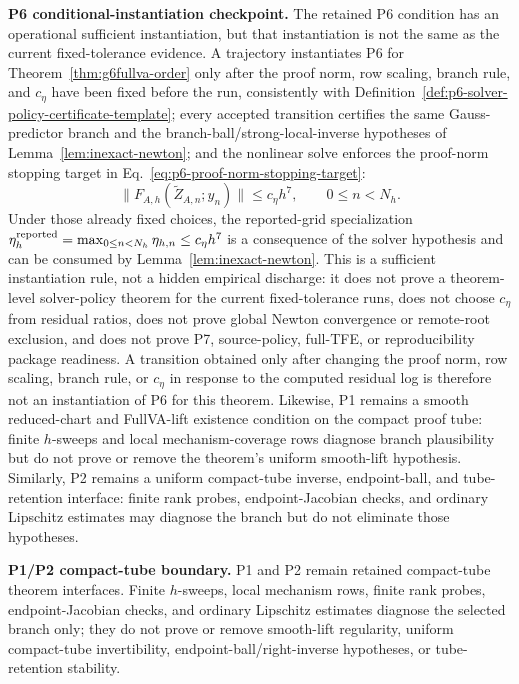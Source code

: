 \documentclass[preprint,12pt]{elsarticle}
\newcommand{\tfe}{TFE}
\begin{document}
\noindent\textbf{P6 conditional-instantiation checkpoint.}
The retained P6 condition has an operational sufficient instantiation, but
that instantiation is not the same as the current fixed-tolerance evidence.  A
trajectory instantiates P6 for Theorem~\ref{thm:g6fullva-order} only after the
proof norm, row scaling, branch rule, and \(c_\eta\) have been fixed before
the run, consistently with
Definition~\ref{def:p6-solver-policy-certificate-template}; every accepted transition certifies the same Gauss-predictor branch
and the branch-ball/strong-local-inverse hypotheses of
Lemma~\ref{lem:inexact-newton}; and the nonlinear solve enforces the
proof-norm stopping target in Eq.~\eqref{eq:p6-proof-norm-stopping-target}:
\begin{equation}
\label{eq:p6-proof-norm-stopping-target}
  \|F_{A,h}(\widetilde Z_{A,n};y_n)\| \le c_\eta h^7,\qquad 0\le n<N_h .
\end{equation}
Under those already fixed choices, the reported-grid specialization
\(\eta_h^{\rm reported}=\max_{0\le n<N_h}\eta_{h,n}\le c_\eta h^7\) is a consequence of the
solver hypothesis and can be consumed by Lemma~\ref{lem:inexact-newton}.  This is
a sufficient instantiation rule, not a hidden empirical discharge: it does
not prove a theorem-level solver-policy theorem for the current fixed-tolerance
runs, does not choose \(c_\eta\) from residual ratios, does not prove global
Newton convergence or remote-root exclusion, and does not prove P7,
source-policy, full-\tfe{}, or reproducibility package readiness.
A transition obtained only after changing the proof norm, row scaling, branch
rule, or \(c_\eta\) in response to the computed residual log is therefore not
an instantiation of P6 for this theorem.
Likewise, P1 remains a smooth reduced-chart and FullVA-lift existence
condition on the compact proof tube: finite \(h\)-sweeps and local
mechanism-coverage rows diagnose branch plausibility but do not prove or
remove the theorem's uniform smooth-lift hypothesis.
Similarly, P2 remains a uniform compact-tube inverse, endpoint-ball, and
tube-retention interface: finite rank probes, endpoint-Jacobian checks, and
ordinary Lipschitz estimates may diagnose the branch but do not eliminate
those hypotheses.

\noindent\textbf{P1/P2 compact-tube boundary.}
P1 and P2 remain retained
compact-tube theorem interfaces. Finite \(h\)-sweeps, local mechanism rows,
finite rank probes, endpoint-Jacobian checks, and ordinary Lipschitz estimates
diagnose the selected branch only; they do not prove or remove smooth-lift
regularity, uniform compact-tube invertibility, endpoint-ball/right-inverse
hypotheses, or tube-retention stability.
\end{document}
